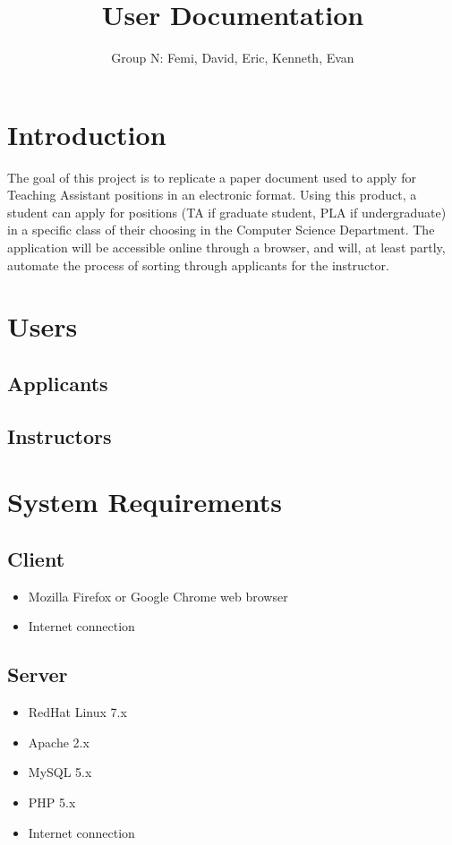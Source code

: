 \documentclass[11pt]{amsart}
\title{User Documentation}
\author{Group N: Femi, David, Eric, Kenneth, Evan}
\begin{document}
\maketitle
\section{Introduction}
\noindent The goal of this project is to replicate a paper document used to apply for Teaching Assistant positions in an electronic format. Using this product, a student can apply for positions (TA if graduate student, PLA if undergraduate) in a specific class of their choosing in the Computer Science Department. The application will be accessible online through a browser, and will, at least partly, automate the process of sorting through applicants for the instructor.
\section{Users}
\subsection{Applicants}


\subsection{Instructors}


\section{System Requirements}
\subsection{Client}
\begin{itemize}
\item{Mozilla Firefox or Google Chrome web browser}
\item{Internet connection}
\end{itemize}

\subsection{Server}
\begin{itemize}
\item{RedHat Linux 7.x}
\item{Apache 2.x}
\item{MySQL 5.x}
\item{PHP 5.x}
\item{Internet connection}
\end{itemize}
\end{document}
